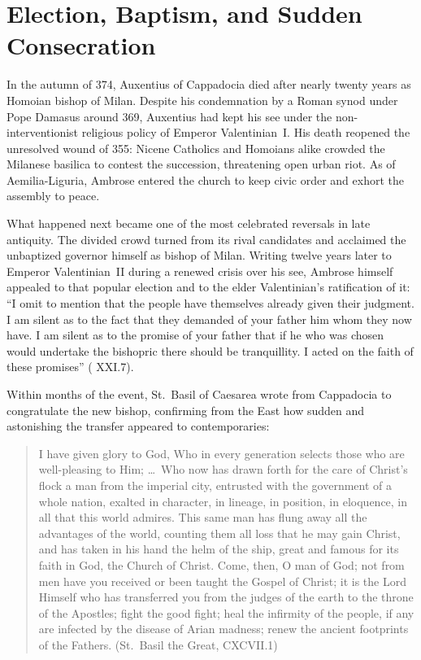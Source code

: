 \section{Election, Baptism, and Sudden Consecration}

In the autumn of 374, Auxentius of Cappadocia died after nearly twenty years as Homoian bishop of Milan. Despite his condemnation by a Roman synod under Pope Damasus around 369, Auxentius had kept his see under the non-interventionist religious policy of Emperor Valentinian~I. His death reopened the unresolved wound of 355: Nicene Catholics and Homoians alike crowded the Milanese basilica to contest the succession, threatening open urban riot. As  of Aemilia-Liguria, Ambrose entered the church to keep civic order and exhort the assembly to peace.

What happened next became one of the most celebrated reversals in late antiquity. The divided crowd turned from its rival candidates and acclaimed the unbaptized governor himself as bishop of Milan. Writing twelve years later to Emperor Valentinian~II during a renewed crisis over his see, Ambrose himself appealed to that popular election and to the elder Valentinian's ratification of it: ``I omit to mention that the people have themselves already given their judgment. I am silent as to the fact that they demanded of your father him whom they now have. I am silent as to the promise of your father that if he who was chosen would undertake the bishopric there should be tranquillity. I acted on the faith of these promises'' ( XXI.7).

Within months of the event, St.~Basil of Caesarea wrote from Cappadocia to congratulate the new bishop, confirming from the East how sudden and astonishing the transfer appeared to contemporaries:

\begin{quote}
I have given glory to God, Who in every generation selects those who are well-pleasing to Him; \ldots\ Who now has drawn forth for the care of Christ's flock a man from the imperial city, entrusted with the government of a whole nation, exalted in character, in lineage, in position, in eloquence, in all that this world admires. This same man has flung away all the advantages of the world, counting them all loss that he may gain Christ, and has taken in his hand the helm of the ship, great and famous for its faith in God, the Church of Christ. Come, then, O man of God; not from men have you received or been taught the Gospel of Christ; it is the Lord Himself who has transferred you from the judges of the earth to the throne of the Apostles; fight the good fight; heal the infirmity of the people, if any are infected by the disease of Arian madness; renew the ancient footprints of the Fathers. (St.~Basil the Great,  CXCVII.1)
\end{quote}

